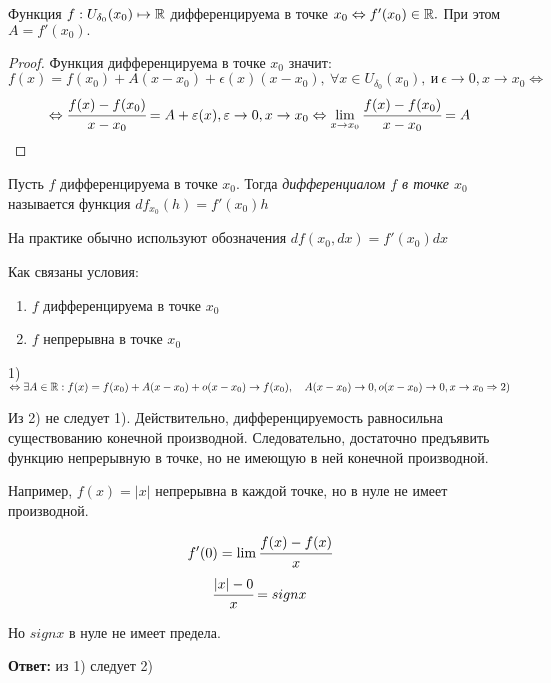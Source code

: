 \begin{theorem}
    Функция $f: U_{\delta_{0}}(x_{0}) \mapsto \R$ дифференцируема в точке $x_{0} \Leftrightarrow f'(x_{0}) \in \R.$ При этом $A = f'(x_{0}).$
\end{theorem}
\begin{proof}
    Функция дифференцируема в точке $x_{0}$ значит:
    $$  f(x) = f(x_{0}) + A(x-x_{0}) + \epsilon(x)(x-x_{0}), \ \forall x \in U_{\delta_{0}}(x_{0}), \ \textrm{и} \ \epsilon \to 0, x \to x_{0} \Leftrightarrow$$
    $$
    \Leftrightarrow \cfrac{f(x)- f(x_{0})}{x - x_{0}} = A  + \epsilon(x), \epsilon \to 0, x \to x_{0} \Leftrightarrow  \lim\limits_{x \to x_{0}} \cfrac{f(x)- f(x_{0})}{x - x_{0}} = A$$
\end{proof}

\begin{definition}
    Пусть $f$ дифференцируема в точке $x_{0}$. Тогда \textit{дифференциалом $f$ в точке $x_{0}$} называется функция $df_{x_{0}}(h) = f'(x_{0})h$

    На практике обычно используют обозначения $df(x_{0}, dx) = f'(x_{0})dx$
\end{definition}

\begin{problem}
    Как связаны условия:
    \begin{enumerate}
        \item $f$ дифференцируема в точке $x_{0}$
        \item $f$ непрерывна в точке $x_{0}$
    \end{enumerate}
\end{problem}
\begin{solution}
    1) $\Leftrightarrow \exists A \in \R: f(x) = f(x_{0}) + A(x-x_{0}) + o(x-x_{0}) \to f(x_{0}), \quad  A(x-x_{0}) \to 0, o(x-x_{0}) \to 0, x\to x_{0} \Rightarrow 2)$

    Из 2) не следует 1). Действительно, дифференцируемость равносильна существованию конечной производной. Следовательно, достаточно предъявить функцию непрерывную в точке, но не имеющую в ней конечной производной. 
    
    Например, $f(x) = |x|$ непрерывна в каждой точке, но в нуле не имеет производной.

    $$f'(0) = \lim\limits \cfrac{f(x) - f(x)}{x}$$
    $$
    \cfrac{|x| - 0}{x} = sign x$$

    Но $sign x$ в нуле не имеет предела.
    
     \textbf{Ответ:} из 1) следует 2)
\end{solution}